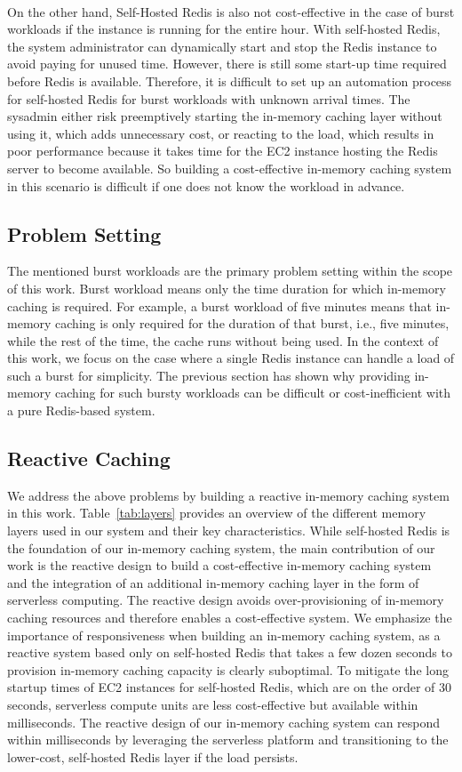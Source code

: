 ~\\ 
On the other hand, Self-Hosted Redis is also not cost-effective in the case of burst workloads if the instance is running for the entire hour. With self-hosted Redis, the system administrator can dynamically start and stop the Redis instance to avoid paying for unused time. However, there is still some start-up time required before Redis is available. Therefore, it is difficult to set up an automation process for self-hosted Redis for burst workloads with unknown arrival times. The sysadmin either risk preemptively starting the in-memory caching layer without using it, which adds unnecessary cost, or reacting to the load, which results in poor performance because it takes time for the EC2 instance hosting the Redis server to become available. So building a cost-effective in-memory caching system in this scenario is difficult if one does not know the workload in advance. 


\subsection{Problem Setting}
The mentioned burst workloads are the primary problem setting within the scope of this work. Burst workload means only the time duration for which in-memory caching is required. For example, a burst workload of five minutes means that in-memory caching is only required for the duration of that burst, i.e., five minutes, while the rest of the time, the cache runs without being used. In the context of this work, we focus on the case where a single Redis instance can handle a load of such a burst for simplicity. The previous section has shown why providing in-memory caching for such bursty workloads can be difficult or cost-inefficient with a pure Redis-based system.

\subsection{Reactive Caching}
We address the above problems by building a reactive in-memory caching system in this work. Table~\ref{tab:layers} provides an overview of the different memory layers used in our system and their key characteristics. While self-hosted Redis is the foundation of our in-memory caching system, the main contribution of our work is the reactive design to build a cost-effective in-memory caching system and the integration of an additional in-memory caching layer in the form of serverless computing. The reactive design avoids over-provisioning of in-memory caching resources and therefore enables a cost-effective system. We emphasize the importance of responsiveness when building an in-memory caching system, as a reactive system based only on self-hosted Redis that takes a few dozen seconds to provision in-memory caching capacity is clearly suboptimal. To mitigate the long startup times of EC2 instances for self-hosted Redis, which are on the order of 30 seconds, serverless compute units are less cost-effective but available within milliseconds. The reactive design of our in-memory caching system can respond within milliseconds by leveraging the serverless platform and transitioning to the lower-cost, self-hosted Redis layer if the load persists.

